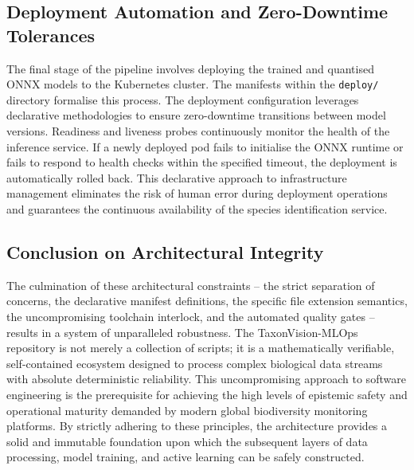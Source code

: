 \subsection{Deployment Automation and Zero-Downtime Tolerances}
The final stage of the pipeline involves deploying the trained and quantised ONNX models to the Kubernetes cluster. The manifests within the \texttt{deploy/} directory formalise this process. The deployment configuration leverages declarative methodologies to ensure zero-downtime transitions between model versions. Readiness and liveness probes continuously monitor the health of the inference service. If a newly deployed pod fails to initialise the ONNX runtime or fails to respond to health checks within the specified timeout, the deployment is automatically rolled back. This declarative approach to infrastructure management eliminates the risk of human error during deployment operations and guarantees the continuous availability of the species identification service.

\subsection{Conclusion on Architectural Integrity}
The culmination of these architectural constraints -- the strict separation of concerns, the declarative manifest definitions, the specific file extension semantics, the uncompromising toolchain interlock, and the automated quality gates -- results in a system of unparalleled robustness. The TaxonVision-MLOps repository is not merely a collection of scripts; it is a mathematically verifiable, self-contained ecosystem designed to process complex biological data streams with absolute deterministic reliability. This uncompromising approach to software engineering is the prerequisite for achieving the high levels of epistemic safety and operational maturity demanded by modern global biodiversity monitoring platforms. By strictly adhering to these principles, the architecture provides a solid and immutable foundation upon which the subsequent layers of data processing, model training, and active learning can be safely constructed.
